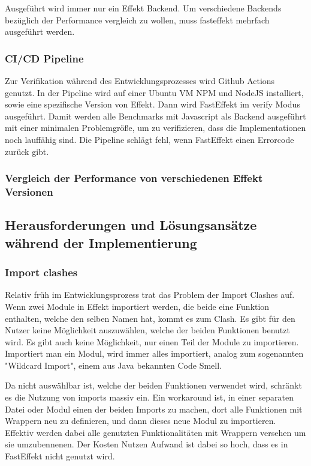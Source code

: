 Ausgeführt wird immer nur ein Effekt Backend. Um verschiedene Backends bezüglich der Performance vergleich zu wollen, muss fasteffekt mehrfach ausgeführt werden.  

\subsubsection{ CI/CD Pipeline }

Zur Verifikation während des Entwicklungsprozesses wird Github Actions genutzt. In der Pipeline wird auf einer Ubuntu VM 
NPM und NodeJS installiert, sowie eine spezifische Version von Effekt. Dann wird FastEffekt im verify Modus ausgeführt. 
Damit werden alle Benchmarks mit Javascript als Backend ausgeführt mit einer minimalen Problemgröße, um zu verifizieren, dass die Implementationen noch lauffähig sind.
Die Pipeline schlägt fehl, wenn FastEffekt einen Errorcode zurück gibt.

\subsubsection{ Vergleich der Performance von verschiedenen Effekt Versionen }
 

\subsection{ Herausforderungen und Lösungsansätze während der Implementierung }

\subsubsection{ Import clashes }
Relativ früh im Entwicklungsprozess trat das Problem der Import Clashes auf. Wenn zwei Module in Effekt importiert werden,
die beide eine Funktion enthalten, welche den selben Namen hat, kommt es zum Clash. Es gibt für den Nutzer keine Möglichkeit 
auszuwählen, welche der beiden Funktionen benutzt wird. Es gibt auch keine Möglichkeit, nur einen Teil der Module zu importieren.
Importiert man ein Modul, wird immer alles importiert, analog zum sogenannten "Wildcard Import", einem aus Java bekannten Code Smell.

Da nicht auswählbar ist, welche der beiden Funktionen verwendet wird, schränkt es die Nutzung von imports massiv ein. Ein workaround ist, in einer
separaten Datei oder Modul einen der beiden Imports zu machen, dort alle Funktionen mit Wrappern neu zu definieren, und dann dieses neue Modul zu importieren.
Effektiv werden dabei alle genutzten Funktionalitäten mit Wrappern versehen um sie umzubennenen. Der Kosten Nutzen Aufwand ist dabei so hoch, dass es in FastEffekt nicht genutzt wird.

